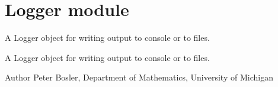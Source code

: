 \hypertarget{group__Logger}{\section{Logger module}
\label{group__Logger}
}


A Logger object for writing output to console or to files.  


A Logger object for writing output to console or to files. 

\begin{DoxyAuthor}{Author}
Peter Bosler, Department of Mathematics, University of Michigan 
\end{DoxyAuthor}
